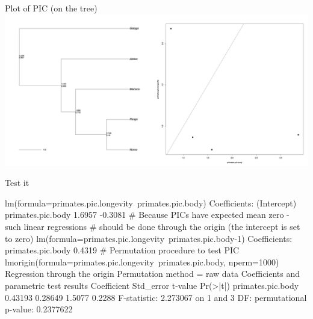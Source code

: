 \documentclass[compress, ucs, xelatex, 11pt, xcolor=svgnames,
  hyperref={
    bookmarks=true,
    unicode=true,
    colorlinks=true,
    pdftitle={Molecular data in R},
    plainpages=false,
    pdfauthor={Vojtech Zeisek},
    pdfsubject={Course about phylogeny and evolution in R},
    pdfcreator={XeLaTeX},
    pdfkeywords={R, evolution, phylogeny, molecular data},
    linkcolor=Tomato,
    anchorcolor=SaddleBrown,
    citecolor=Goldenrod,
    filecolor=DarkMagenta,
    menucolor=Sienna,
    urlcolor=DarkTurquoise,
    pdftex},
  url={hyphens, lowtilde} %
  ]{beamer}
\begin{document}
\begin{frame}{Plot of PIC (on the tree)}
\includegraphics[width=\textwidth]{pic.png}
\end{frame}

\begin{frame}[fragile]{Test it}
  \begin{spluscode}
    lm(formula=primates.pic.longevity~primates.pic.body)
    Coefficients:
      (Intercept)  primates.pic.body
           1.6957            -0.3081
    # Because PICs have expected mean zero - such linear regressions
    # should be done through the origin (the intercept is set to zero)
    lm(formula=primates.pic.longevity~primates.pic.body-1)
    Coefficients:
    primates.pic.body
               0.4319
    # Permutation procedure to test PIC
    lmorigin(formula=primates.pic.longevity~primates.pic.body, nperm=1000)
    Regression through the origin
    Permutation method = raw data
    Coefficients and parametric test results
                       Coefficient Std_error t-value Pr(>|t|)
    primates.pic.body     0.43193   0.28649  1.5077   0.2288
    F-statistic: 2.273067 on 1 and 3 DF:
      permutational p-value: 0.2377622
  \end{spluscode}
\end{frame}
\end{document}
